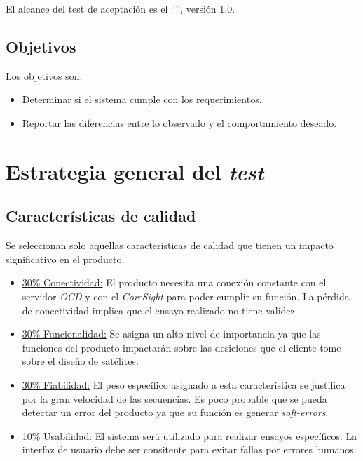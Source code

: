 \documentclass[
    11pt,
    spanish,
	a4paper
]{article}
\begin{document}
El alcance del test de aceptación es el ``\MyTitle '', versión 1.0.

\subsection{Objetivos}
\label{sub:objetivos}

Los objetivos son:

\begin{itemize}
	\item Determinar si el sistema cumple con los requerimientos.
	\item Reportar las diferencias entre lo observado y el comportamiento deseado.
\end{itemize}


\section{Estrategia general del \emph{test}}
\label{sec:estrategia}

\subsection{Características de calidad}
\label{sub:caracteristicasCalidad}

Se seleccionan solo aquellas características de calidad que tienen un impacto significativo en el producto.

\begin{itemize}
    \item \underline{30\% Conectividad:} El producto necesita una conexión constante con el servidor \emph{OCD} y con el \emph{CoreSight} para poder cumplir su función. La pérdida de conectividad implica que el ensayo realizado no tiene validez.
    \item \underline{30\% Funcionalidad:} Se asigna un alto nivel de importancia ya que las funciones del producto impactarán sobre las desiciones que el cliente tome sobre el diseño de satélites.
    \item \underline{30\% Fiabilidad:} El peso específico asignado a esta característica se justifica por la gran velocidad de las secuencias. Es poco probable que se pueda detectar un error del producto ya que su función es generar \emph{soft-errors}.
    \item \underline{10\% Usabilidad:} El sistema será utilizado para realizar ensayos específicos. La interfaz de usuario debe ser consitente para evitar fallas por errores humanos.
\end{itemize}
\end{document}
